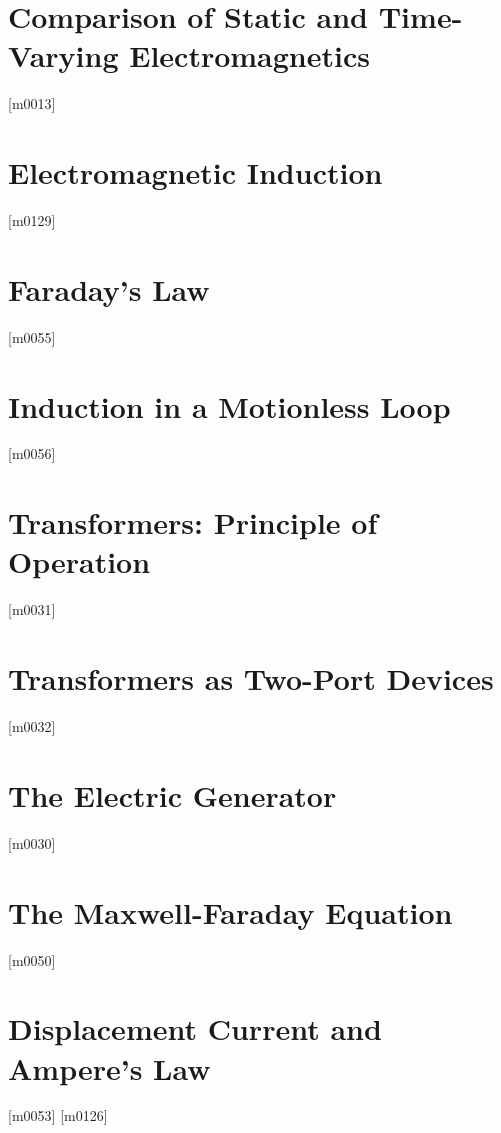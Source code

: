 \documentclass[10pt,letterpaper,twocolumn,openany]{book}
\theoremstyle{definition} %
\begin{document}
    \section{Comparison of Static and Time-Varying Electromagnetics}
{\color{blue}\tiny[m0013]}      
      \vfill\break
    \section{Electromagnetic Induction}
{\color{blue}\tiny[m0129]}      
      \vfill\break
    \section{Faraday's Law}
{\color{blue}\tiny[m0055]}      
      \vfill\break
    \section{Induction in a Motionless Loop}
{\color{blue}\tiny[m0056]}      
      \vfill\break
    \section{Transformers: Principle of Operation}
{\color{blue}\tiny[m0031]}      
      \vfill\break
    \section{Transformers as Two-Port Devices}
{\color{blue}\tiny[m0032]}      
      \vfill\break
    \section{The Electric Generator}
{\color{blue}\tiny[m0030]}      
      \vfill\break
    \section{The Maxwell-Faraday Equation}
{\color{blue}\tiny[m0050]}      
      \vfill\break
    \section{Displacement Current and Ampere's Law}
{\color{blue}\tiny[m0053]}      
{\color{blue}\tiny[m0126]}    
\end{document}
